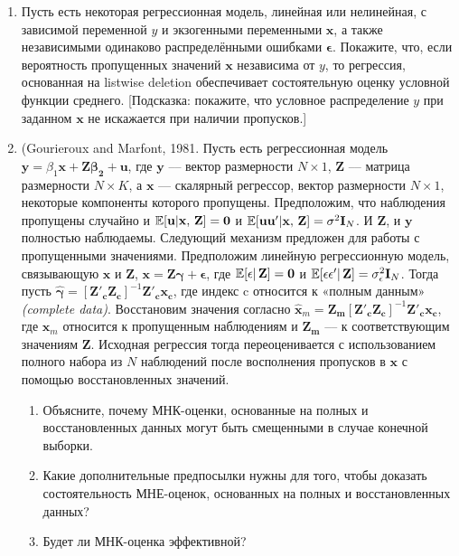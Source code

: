 \begin{enumerate}
\item Пусть есть некоторая регрессионная модель, линейная или нелинейная, с зависимой переменной $y$ и экзогенными переменными $\mathbf{x}$, а также независимыми одинаково распределёнными ошибками $\mathbf{\epsilon}$. Покажите, что, если вероятность пропущенных значений $\mathbf{x}$ независима от $y$, то регрессия, основанная на listwise deletion обеспечивает состоятельную оценку условной функции среднего. [Подсказка: покажите, что условное распределение $y$ при заданном $\mathbf{x}$ не искажается при наличии пропусков.]

\item (Gourieroux and Marfont, 1981. Пусть есть регрессионная модель $\mathbf{y}=\beta_1\mathbf{x}+\mathbf{Z\beta_2} + \mathbf{u}$, где $\mathbf{y}$ --– вектор размерности $N \times 1$, $\mathbf{Z}$ --– матрица размерности $N \times K$, а $\mathbf{x}$ --– скалярный регрессор, вектор размерности $N \times 1$, некоторые компоненты которого пропущены. Предположим, что наблюдения пропущены случайно и $\mathbb{E}[\mathbf{u}|\mathbf{x, \, Z}]=\mathbf{0}$ и $\mathbb{E}[\mathbf{uu'}|\mathbf{x, \, Z}]=\sigma^2\mathbf{I}_N$. И $\mathbf{Z}$, и $\mathbf{y}$ полностью наблюдаемы. Следующий механизм предложен для работы с пропущенными значениями. Предположим линейную регрессионную модель, связывающую $\mathbf{x}$ и $\mathbf{Z}$, $\mathbf{x}=\mathbf{Z\gamma}+ \mathbf{\epsilon}$, где $\mathbb{E}[\mathbf{\epsilon}| \, \mathbf{Z}]=\mathbf{0}$ и $\mathbb{E}[\mathbf{\epsilon \epsilon'}| \, \mathbf{Z}]=\sigma^2_{\epsilon}\mathbf{I}_N$. Тогда пусть $\widehat{\mathbf{\gamma}}=[\mathbf{Z'_c Z_c}]^{-1}\mathbf{Z'_c x_c}$, где индекс c относится к «полным данным» \emph{(complete data)}. Восстановим значения согласно $\widehat{\mathbf{x}}_m=\mathbf{Z_m}[\mathbf{Z'_c Z_c}]^{-1}\mathbf{Z'_c x_c}$, где $\mathbf{x}_m$ относится к пропущенным наблюдениям и $\mathbf{Z_m}$ –-- к соответствующим значениям $\mathbf{Z}$. Исходная регрессия тогда переоценивается с использованием полного набора из $N$ наблюдений после восполнения пропусков в $\mathbf{x}$ с помощью восстановленных значений.
\begin{enumerate}
\item	Объясните, почему МНК-оценки, основанные на полных и восстановленных данных могут быть смещенными в случае конечной выборки.
\item	Какие дополнительные предпосылки нужны для того, чтобы доказать состоятельность МНЕ-оценок, основанных на полных и восстановленных данных?
\item	Будет ли МНК-оценка эффективной?
\end{enumerate}


\end{enumerate}
